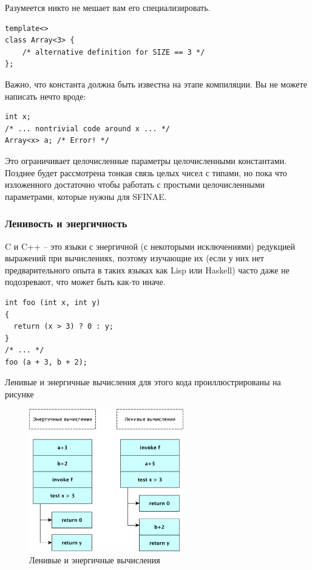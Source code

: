 \documentclass[a4paper,12pt,oneside]{article}
\begin{document}
Разумеется никто не мешает вам его специализировать.

\begin{lstlisting}
template<>
class Array<3> {
    /* alternative definition for SIZE == 3 */
};
\end{lstlisting}

Важно, что константа должна быть известна на этапе компиляции. Вы не можете написать нечто вроде:

\begin{lstlisting}
int x;
/* ... nontrivial code around x ... */
Array<x> a; /* Error! */
\end{lstlisting}

Это ограничивает целочисленные параметры целочисленными константами. Позднее будет рассмотрена тонкая связь целых чисел с типами, но пока что изложенного достаточно чтобы работать с простыми целочисленными параметрами, которые нужны для SFINAE.

\subsubsection{Ленивость и энергичность}

C и C++ -- это языки с энергичной (с некоторыми исключениями) редукцией выражений при вычислениях, поэтому изучающие их (если у них нет предварительного опыта в таких языках как Lisp или Haskell) часто даже не подозревают, что может быть как-то иначе.

\begin{lstlisting}
int foo (int x, int y)
{
  return (x > 3) ? 0 : y;
}
/* ... */
foo (a + 3, b + 2);
\end{lstlisting}

Ленивые и энергичные вычисления для этого кода проиллюстрированы на рисунке

\begin{figure}[h!]
\centering
\includegraphics[width=0.6\textwidth]{illustrations/lazyorder-crop.pdf}
\caption{Ленивые и энергичные вычисления}
\label{fig:lazy_calc}
\end{figure}
\end{document}
